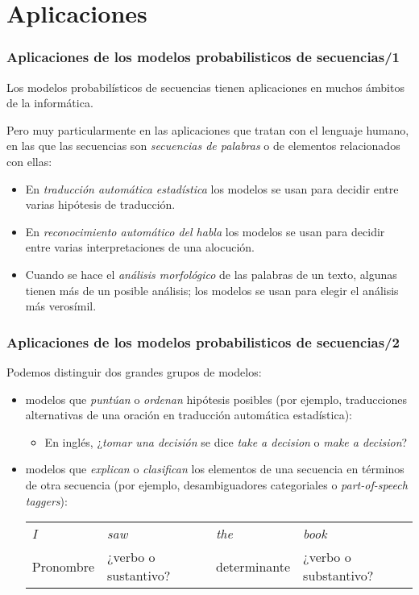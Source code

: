 \section{Aplicaciones}
\begin{frame}
  \frametitle{Aplicaciones de los modelos probabilisticos de secuencias/1}

Los modelos probabilísticos de secuencias tienen aplicaciones en muchos ámbitos de la informática.

Pero muy particularmente en las aplicaciones que tratan con el
lenguaje humano, en las que las secuencias son \emph{secuencias de
  palabras} o de elementos relacionados con ellas:
\begin{itemize}
\item En \emph{traducción automática estadística} los modelos se usan para decidir entre varias hipótesis de traducción.
\item En \emph{reconocimiento automático del habla} los modelos se usan para decidir entre varias interpretaciones de una alocución.
\item Cuando se hace el \emph{análisis morfológico} de las palabras de
  un texto, algunas tienen más de un posible análisis; los modelos se
  usan para elegir el análisis más verosímil.
\end{itemize}

\end{frame}

\begin{frame}
  \frametitle{Aplicaciones de los modelos probabilisticos de secuencias/2}

Podemos distinguir dos grandes grupos de modelos:
\begin{itemize}
\item modelos que \emph{puntúan} o \emph{ordenan} hipótesis posibles (por ejemplo, traducciones alternativas de una oración en traducción automática estadística):
  \begin{itemize}
  \item En inglés, ¿\emph{tomar una decisión} se dice \emph{take a decision} o \emph{make a decision}?
  \end{itemize}
\item modelos que \emph{explican} o \emph{clasifican} los elementos de una secuencia en términos de otra secuencia (por ejemplo, desambiguadores categoriales o \emph{part-of-speech taggers}):
  \begin{tabular}{p{2cm}p{2cm}p{2cm}p{2cm}}
\emph{I} 	&\emph{saw} 	&\emph{the} 	&\emph{book}\\
Pronombre	&¿verbo o sustantivo? &determinante &¿verbo o substantivo?\\
   \end{tabular}
\end{itemize}

\end{frame}
